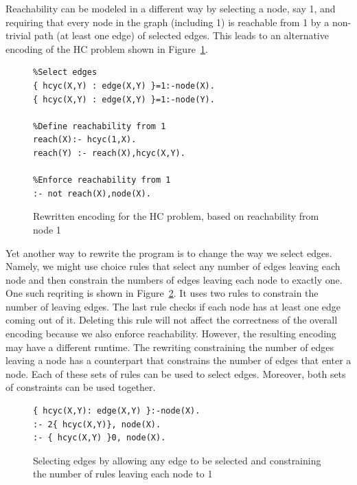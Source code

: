 \documentclass{new_tlp}
\begin{document}
Reachability can be modeled in a different way by selecting a node, say 1, and
requiring that every node in the graph (including 1) is reachable from 1 by a 
non-trivial path (at least one edge) of selected edges. This leads to an 
alternative encoding of the HC problem shown in Figure~\ref{reachencod2}.  

\begin{figure}
\figrule
\begin{center}
\begin{verbatim}
%Select edges
{ hcyc(X,Y) : edge(X,Y) }=1:-node(X).
{ hcyc(X,Y) : edge(X,Y) }=1:-node(Y).

%Define reachability from 1
reach(X):- hcyc(1,X).
reach(Y) :- reach(X),hcyc(X,Y).

%Enforce reachability from 1
:- not reach(X),node(X).
\end{verbatim}
\end{center}
\caption{Rewritten encoding for the HC problem, based on reachability from
node 1}\label{reachencod2}
\figrule
\end{figure}

Yet another way to rewrite the program is to change the way we select edges.
Namely, we might use choice rules that select any number of edges leaving each 
node and then constrain the numbers of edges leaving each node to exactly one.
One such reqriting is shown in Figure~\ref{breakrule}. It uses two rules to 
constrain the number of leaving edges. The last rule checks if each node has 
at least one edge coming out of it. Deleting this rule will not affect the 
correctness of the overall encoding because we also enforce reachability. 
However, the resulting encoding may have a different runtime. The rewriting 
constraining the number of edges leaving a node has a counterpart that 
constrains the number of edges that enter a node. Each of these sets of
rules can be used to select edges. Moreover, both sets of constraints can 
be used together. 

\begin{figure}
\figrule
\begin{center}
\begin{verbatim}
{ hcyc(X,Y): edge(X,Y) }:-node(X).
:- 2{ hcyc(X,Y)}, node(X).
:- { hcyc(X,Y) }0, node(X).
\end{verbatim}
\end{center}
\caption{Selecting edges by allowing any edge to be selected and constraining
the number of rules leaving each node  to 1}\label{breakrule}
\figrule
\end{figure}
\end{document}
